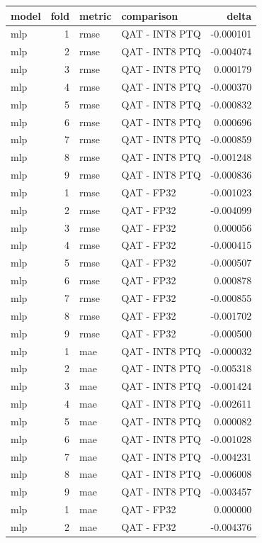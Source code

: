 \begin{tabular}{lrllr}
\toprule
model & fold & metric & comparison & delta \\
\midrule
mlp & 1 & rmse & QAT - INT8 PTQ & -0.000101 \\
mlp & 2 & rmse & QAT - INT8 PTQ & -0.004074 \\
mlp & 3 & rmse & QAT - INT8 PTQ & 0.000179 \\
mlp & 4 & rmse & QAT - INT8 PTQ & -0.000370 \\
mlp & 5 & rmse & QAT - INT8 PTQ & -0.000832 \\
mlp & 6 & rmse & QAT - INT8 PTQ & 0.000696 \\
mlp & 7 & rmse & QAT - INT8 PTQ & -0.000859 \\
mlp & 8 & rmse & QAT - INT8 PTQ & -0.001248 \\
mlp & 9 & rmse & QAT - INT8 PTQ & -0.000836 \\
mlp & 1 & rmse & QAT - FP32 & -0.001023 \\
mlp & 2 & rmse & QAT - FP32 & -0.004099 \\
mlp & 3 & rmse & QAT - FP32 & 0.000056 \\
mlp & 4 & rmse & QAT - FP32 & -0.000415 \\
mlp & 5 & rmse & QAT - FP32 & -0.000507 \\
mlp & 6 & rmse & QAT - FP32 & 0.000878 \\
mlp & 7 & rmse & QAT - FP32 & -0.000855 \\
mlp & 8 & rmse & QAT - FP32 & -0.001702 \\
mlp & 9 & rmse & QAT - FP32 & -0.000500 \\
mlp & 1 & mae & QAT - INT8 PTQ & -0.000032 \\
mlp & 2 & mae & QAT - INT8 PTQ & -0.005318 \\
mlp & 3 & mae & QAT - INT8 PTQ & -0.001424 \\
mlp & 4 & mae & QAT - INT8 PTQ & -0.002611 \\
mlp & 5 & mae & QAT - INT8 PTQ & 0.000082 \\
mlp & 6 & mae & QAT - INT8 PTQ & -0.001028 \\
mlp & 7 & mae & QAT - INT8 PTQ & -0.004231 \\
mlp & 8 & mae & QAT - INT8 PTQ & -0.006008 \\
mlp & 9 & mae & QAT - INT8 PTQ & -0.003457 \\
mlp & 1 & mae & QAT - FP32 & 0.000000 \\
mlp & 2 & mae & QAT - FP32 & -0.004376 \\

\end{tabular}
